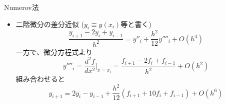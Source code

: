 \begin{frame}[t,fragile]{Numerov法}
  \begin{itemize}
  \item 二階微分の差分近似 ($y_i \equiv y(x_i)$等と書く)
    \[
    \frac{y_{i+1} - 2 y_i + y_{i-1}}{h^2} = y''_{i} + \frac{h^2}{12} y''''_{i} + O(h^4)
    \]
  一方で、微分方程式より
    \[
    y''''_i = \frac{d^2f}{dx^2}\Big|_{x=x_i} = \frac{f_{i+1}-2f_i+f_{i-1}}{h^2} + O(h^2)
    \]
    組み合わせると
    \[
    y_{i+1} = 2y_i - y_{i-1} + \frac{h^2}{12} (f_{i+1} + 10f_{i} + f_{i-1}) + O(h^6)
    \]
  \end{itemize}
\end{frame}
